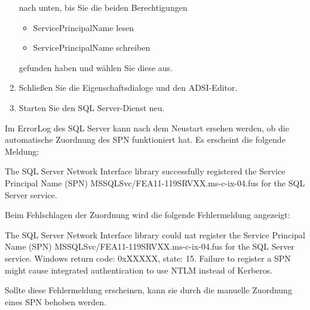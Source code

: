 \begin{enumerate}
            nach unten, bis Sie die beiden Berechtigungen
              \begin{itemize}
                \item ServicePrincipalName lesen
                \item ServicePrincipalName schreiben
              \end{itemize}
            gefunden haben und wählen Sie diese aus.
\clearpage
            \item Schließen Sie die Eigenschaftsdialoge und den ADSI-Editor.
            \item Starten Sie den SQL Server-Dienst neu.
          \end{enumerate}
          Im ErrorLog des SQL Server kann nach dem Neustart ersehen werden, ob
          die automatische Zuordnung des SPN funktioniert hat. Es erscheint die
          folgende Meldung:
          
          The SQL Server Network Interface library successfully registered the
          Service Principal Name (SPN) MSSQLSvc/FEA11-119SRVXX.ms-c-ix-04.fus
          for the SQL Server service.
          
          Beim Fehlschlagen der Zuordnung wird die folgende Fehlermeldung
          angezeigt:
          
          The SQL Server Network Interface library could nat register the
          Service Principal Name (SPN) MSSQLSvc/FEA11-119SRVXX.ms-c-ix-04.fus
          for the SQL Server service. Windows return code: 0xXXXXX, state: 15.
          Failure to register a SPN might cause integrated authentication to use
          NTLM instead of Kerberos.
          
          Sollte diese Fehlermeldung erscheinen, kann sie durch die manuelle
          Zuordnung eines SPN behoben werden.
          \begin{literaturinternet}
            \item \cite{btmcm210tsnilwutrs}
            \item \cite{mswcttssnilcnrtspns}
            \item \cite{ms191153}
          \end{literaturinternet}
